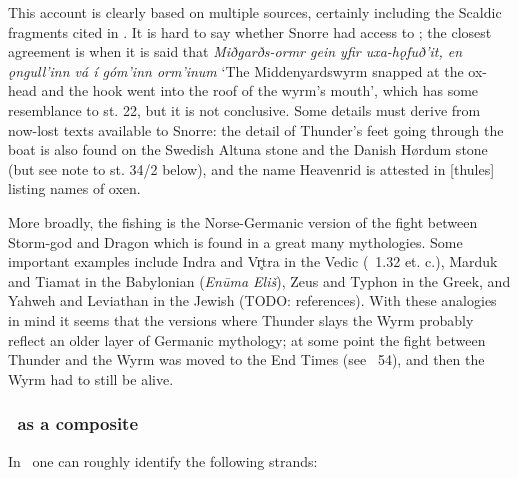 This account is clearly based on multiple sources, certainly including the Scaldic fragments cited in \Skaldskaparmal.  It is hard to say whether Snorre had access to \Hymiskvida; the closest agreement is when it is said that \emph{Miðgarðs-ormr gein yfir uxa-hǫfuð’it, en ǫngull’inn vá í góm’inn orm’inum} ‘The Middenyardswyrm snapped at the ox-head and the hook went into the roof of the wyrm’s mouth’, which has some resemblance to st. 22, but it is not conclusive.  Some details must derive from now-lost texts available to Snorre: the detail of Thunder’s feet going through the boat is also found on the Swedish Altuna stone and the Danish Hørdum stone (but see note to st. 34/2 below), and the name Heavenrid is attested in [thules] listing names of oxen.

\sectionline

More broadly, the fishing is the Norse-Germanic version of the fight between Storm-god and Dragon which is found in a great many mythologies.  Some important examples include Indra and Vr̥tra in the Vedic (\Rigveda\ 1.32 et. c.), Marduk and Tiamat in the Babylonian (\emph{Enūma Eliš}), Zeus and Typhon in the Greek, and Yahweh and Leviathan in the Jewish (TODO: references).  With these analogies in mind it seems that the versions where Thunder slays the Wyrm probably reflect an older layer of Germanic mythology; at some point the fight between Thunder and the Wyrm was moved to the End Times (see \Voluspa\ 54), and then the Wyrm had to still be alive.

\subsubsection{\Hymiskvida\ as a composite}

In \Hymiskvida\ one can roughly identify the following strands:

